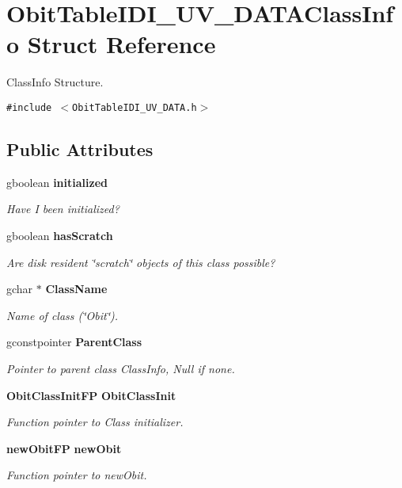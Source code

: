 \section{Obit\-Table\-IDI\_\-UV\_\-DATAClass\-Info Struct Reference}
\label{structObitTableIDI__UV__DATAClassInfo}
Class\-Info Structure.  


{\tt \#include $<$Obit\-Table\-IDI\_\-UV\_\-DATA.h$>$}

\subsection*{Public Attributes}
\begin{CompactItemize}
\item 
gboolean {\bf initialized}
\begin{CompactList}\small\item\em Have I been initialized? \item\end{CompactList}\item 
gboolean {\bf has\-Scratch}
\begin{CompactList}\small\item\em Are disk resident \char`\"{}scratch\char`\"{} objects of this class possible? \item\end{CompactList}\item 
gchar $\ast$ {\bf Class\-Name}
\begin{CompactList}\small\item\em Name of class (\char`\"{}Obit\char`\"{}). \item\end{CompactList}\item 
gconstpointer {\bf Parent\-Class}
\begin{CompactList}\small\item\em Pointer to parent class Class\-Info, Null if none. \item\end{CompactList}\item 
{\bf Obit\-Class\-Init\-FP} {\bf Obit\-Class\-Init}
\begin{CompactList}\small\item\em Function pointer to Class initializer. \item\end{CompactList}\item 
{\bf new\-Obit\-FP} {\bf new\-Obit}
\begin{CompactList}\small\item\em Function pointer to new\-Obit. \item\end{CompactList}\item 

\end{CompactItemize}
